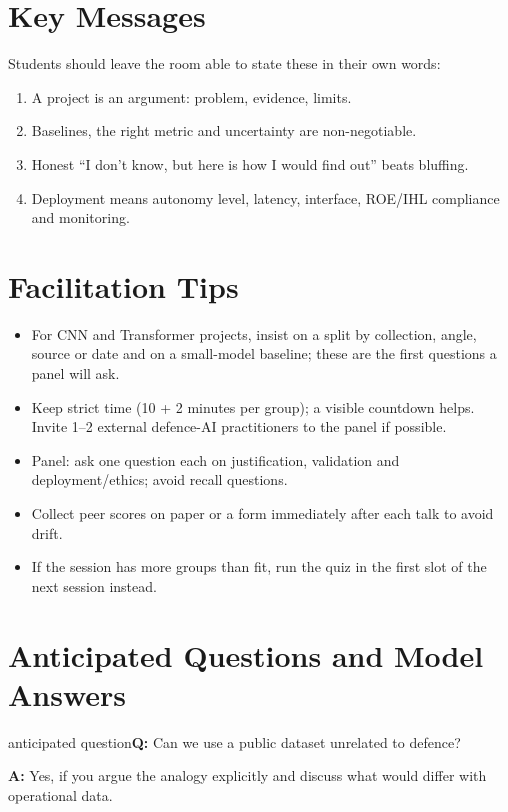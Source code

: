 \documentclass[11pt]{article}
\begin{document}
\section{Key Messages}Students should leave the room able to state these in their own words:\begin{keypoint}\begin{enumerate}\item A project is an argument: problem, evidence, limits.\item Baselines, the right metric and uncertainty are non-negotiable.\item Honest ``I don't know, but here is how I would find out'' beats bluffing.\item Deployment means autonomy level, latency, interface, ROE/IHL compliance and monitoring.\end{enumerate}\end{keypoint}

\section{Facilitation Tips}\begin{itemize}\item For CNN and Transformer projects, insist on a split by collection, angle, source or date and on a small-model baseline; these are the first questions a panel will ask.\item Keep strict time (10 + 2 minutes per group); a visible countdown helps. Invite 1--2 external defence-AI practitioners to the panel if possible.\item Panel: ask one question each on justification, validation and deployment/ethics; avoid recall questions.\item Collect peer scores on paper or a form immediately after each talk to avoid drift.\item If the session has more groups than fit, run the quiz in the first slot of the next session instead.\end{itemize}

\section{Anticipated Questions and Model Answers}

\begin{question}{anticipated question}\textbf{Q:} Can we use a public dataset unrelated to defence?\par\smallskip\textbf{A:} Yes, if you argue the analogy explicitly and discuss what would differ with operational data.\end{question}
\end{document}
